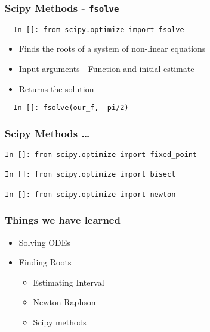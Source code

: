 \documentclass[14pt,compress]{beamer}
\newcommand{\typ}[1]{\lstinline{#1}}
\begin{document}
\begin{frame}[fragile]
\frametitle{Scipy Methods - \typ{fsolve}}
\begin{small}
\begin{lstlisting}
  In []: from scipy.optimize import fsolve
\end{lstlisting}
\end{small}
\begin{itemize}
\item Finds the roots of a system of non-linear equations
\item Input arguments - Function and initial estimate
\item Returns the solution
\end{itemize}
\begin{lstlisting}
  In []: fsolve(our_f, -pi/2)
\end{lstlisting}
\end{frame}

\begin{frame}[fragile]
\frametitle{Scipy Methods \dots}
\begin{small}
\begin{lstlisting}
In []: from scipy.optimize import fixed_point

In []: from scipy.optimize import bisect

In []: from scipy.optimize import newton
\end{lstlisting}
\end{small}
\end{frame}

\begin{frame}
  \frametitle{Things we have learned}
  \begin{itemize}
  \item Solving ODEs
  \item Finding Roots
    \begin{itemize}
    \item Estimating Interval
    \item Newton Raphson
    \item Scipy methods
    \end{itemize}
  \end{itemize}
\end{frame}
\end{document}
